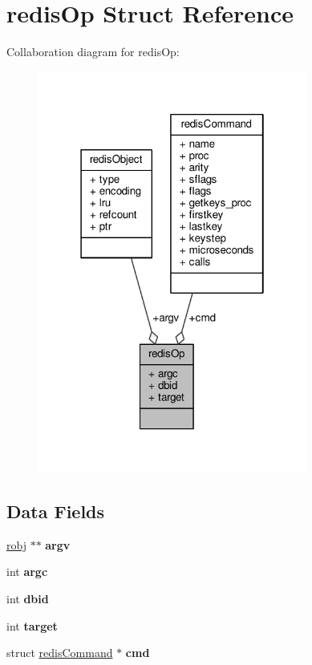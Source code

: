 \hypertarget{structredisOp}{}\section{redis\+Op Struct Reference}
\label{structredisOp}


Collaboration diagram for redis\+Op\+:\nopagebreak
\begin{figure}[H]
\begin{center}
\leavevmode
\includegraphics[width=250pt]{structredisOp__coll__graph}
\end{center}
\end{figure}
\subsection*{Data Fields}
\begin{DoxyCompactItemize}
\item 
\mbox{\label{structredisOp_acf3641396d2a361fe312b575f4ab9e85}} 
\hyperlink{structredisObject}{robj} $\ast$$\ast$ {\bfseries argv}
\item 
\mbox{\label{structredisOp_a3c09f5951da716ea4c4cb37603dacdf3}} 
int {\bfseries argc}
\item 
\mbox{\label{structredisOp_a0bb6d12ef020e7d31c041455526a880e}} 
int {\bfseries dbid}
\item 
\mbox{\label{structredisOp_a98c8d1ace5a01739c2fe478357779221}} 
int {\bfseries target}
\item 
\mbox{\label{structredisOp_a7e9958bc58002330df5acccbaba0dfa3}} 
struct \hyperlink{structredisCommand}{redis\+Command} $\ast$ {\bfseries cmd}
\end{DoxyCompactItemize}


